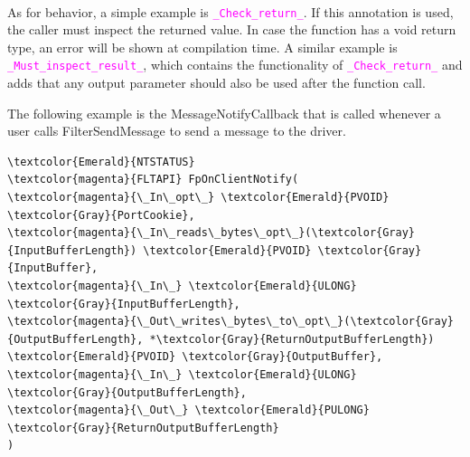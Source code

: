 		\paragraph{}
		As for behavior, a simple example is \textcolor{magenta}{\texttt{\_Check\_return\_}}. If this annotation is used, the caller must inspect the returned value. In case the function has a void return type, an error will be shown at compilation time. A similar example is \textcolor{magenta}{\texttt{\_Must\_inspect\_result\_}}, which contains the functionality of \textcolor{magenta}{\texttt{\_Check\_return\_}} and adds that any output parameter should also be used after the function call.
		
		The following example is the MessageNotifyCallback that is called whenever a user calls FilterSendMessage to send a message to the driver. 
		
		\pagebreak
		\begin{Verbatim}[fontsize=\small, commandchars=\\\{\}]
\textcolor{Emerald}{NTSTATUS}
\textcolor{magenta}{FLTAPI} FpOnClientNotify(
\textcolor{magenta}{\_In\_opt\_} \textcolor{Emerald}{PVOID} \textcolor{Gray}{PortCookie},
\textcolor{magenta}{\_In\_reads\_bytes\_opt\_}(\textcolor{Gray}{InputBufferLength}) \textcolor{Emerald}{PVOID} \textcolor{Gray}{InputBuffer},
\textcolor{magenta}{\_In\_} \textcolor{Emerald}{ULONG} \textcolor{Gray}{InputBufferLength},
\textcolor{magenta}{\_Out\_writes\_bytes\_to\_opt\_}(\textcolor{Gray}{OutputBufferLength}, *\textcolor{Gray}{ReturnOutputBufferLength})
\textcolor{Emerald}{PVOID} \textcolor{Gray}{OutputBuffer},
\textcolor{magenta}{\_In\_} \textcolor{Emerald}{ULONG} \textcolor{Gray}{OutputBufferLength},
\textcolor{magenta}{\_Out\_} \textcolor{Emerald}{PULONG} \textcolor{Gray}{ReturnOutputBufferLength}
)
		
		\end{Verbatim}
		
